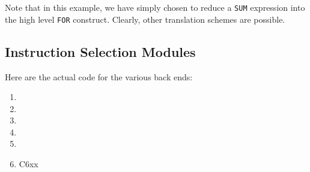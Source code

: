 Note that in this example, we have simply chosen to reduce
a \verb|SUM| expression into the high level \verb|FOR| construct.
Clearly, other translation schemes are possible.

\subsection{Instruction Selection Modules}
Here are the actual code for the various back ends:
\begin{enumerate}
  \item {}
  \item {}
  \item {}
  \item {}
  \item {}
  \item C6xx 
\end{enumerate}
